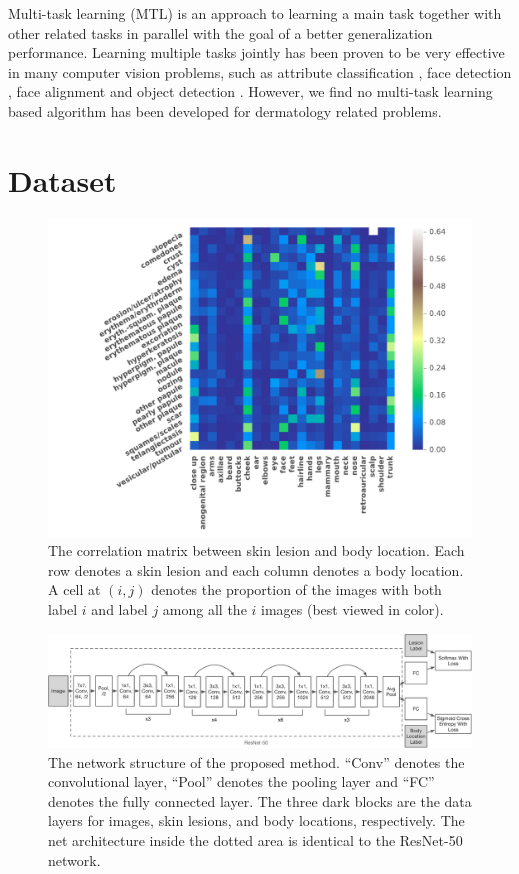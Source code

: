 \documentclass[letterpaper]{article}
\begin{document}
Multi-task learning (MTL) \cite{DBLP:journals/ml/Caruana97} is an approach to
learning a main task together with other related tasks in parallel with the goal
of a better generalization performance. Learning multiple tasks jointly has been
proven to be very effective in many computer vision problems, such as attribute
classification \cite{DBLP:journals/corr/HandC16}, face detection \cite{DBLP:journals/corr/RanjanPC16},
face alignment \cite{DBLP:journals/pami/ZhangLLT16} and object detection \cite{DBLP:conf/nips/RenHGS15}.
However, we find no multi-task learning based algorithm has been developed for
dermatology related problems.

\section{Dataset}

\begin{figure}
  \centering
  \includegraphics[scale=0.51]{label_correlation.pdf}
  \caption{The correlation matrix between skin lesion and body location. Each row
  denotes a skin lesion and each column denotes a body location. A cell at
  $(i, j)$ denotes the proportion of the images with both label $i$ and
  label $j$ among all the $i$ images (best viewed in color).}
  \label{fig: correlation}
\end{figure}

\begin{figure}[!ht]
  \centering
  \includegraphics[scale=0.36]{architecture.pdf}
  \caption{The network structure of the proposed method. ``Conv'' denotes the
  convolutional layer, ``Pool'' denotes the pooling layer and ``FC'' denotes the
  fully connected layer. The three dark blocks are the data layers for images,
  skin lesions, and body locations, respectively. The net architecture inside
  the dotted area is identical to the ResNet-50 network.
  }
  \label{fig: architecture}
\end{figure}
\end{document}
